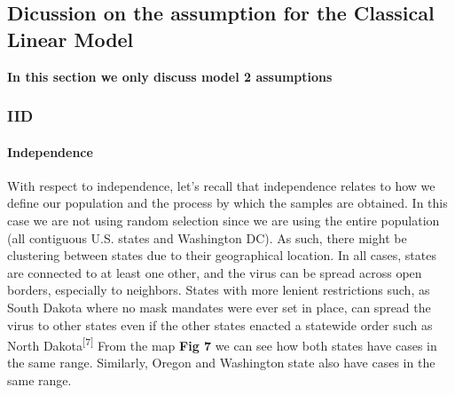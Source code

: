 \documentclass[
]{article}
\begin{document}
\hypertarget{dicussion-on-the-assumption-for-the-classical-linear-model}{%
\subsection{Dicussion on the assumption for the Classical Linear
Model}\label{dicussion-on-the-assumption-for-the-classical-linear-model}}

\textbf{In this section we only discuss model 2 assumptions}\\

\hypertarget{iid}{%
\subsubsection{IID}\label{iid}}

\hypertarget{independence}{%
\paragraph{Independence}\label{independence}}

With respect to independence, let's recall that independence relates to
how we define our population and the process by which the samples are
obtained. In this case we are not using random selection since we are
using the entire population (all contiguous U.S. states and Washington
DC). As such, there might be clustering between states due to their
geographical location. In all cases, states are connected to at least
one other, and the virus can be spread across open borders, especially
to neighbors. States with more lenient restrictions such, as South
Dakota where no mask mandates were ever set in place, can spread the
virus to other states even if the other states enacted a statewide order
such as North Dakota\textsuperscript{{[}7{]}} From the map \textbf{Fig
7} we can see how both states have cases in the same range. Similarly,
Oregon and Washington state also have cases in the same range.\\
\end{document}
